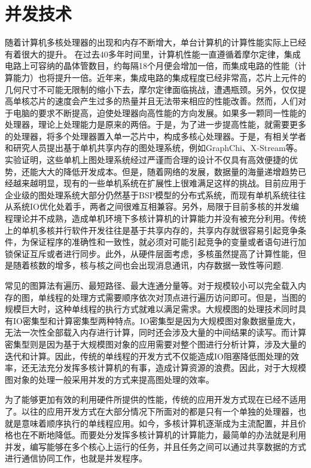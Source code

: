 \section{并发技术}

随着计算机多核处理器的出现和内存不断增大，单台计算机的计算性能实际上已经有着很大的提升。
在过去40多年时间里，计算机性能一直遵循着摩尔定律，集成电路上可容纳的晶体管数目，约每隔18个月便会增加一倍，而集成电路的性能（计算能力）也将提升一倍。近年来，集成电路的集成程度已经非常高，芯片上元件的几何尺寸不可能无限制的缩小下去，摩尔定律面临挑战，遭遇瓶颈。另外，仅仅提高单核芯片的速度会产生过多的热量并且无法带来相应的性能改善。然而，人们对于电脑的要求不断提高，迫使处理器向高性能的方向发展。如果多一颗同一性能的处理器，理论上处理能力是原来的两倍。于是，为了进一步提高性能，就需要更多的处理器，将多个处理器置入单一芯片中，构成多核心处理器。于是，有相关学者和研究人员提出基于单机共享内存的图处理系统，例如GraphChi、X-Stream等。实验证明，这些单机上图处理系统经过严谨而合理的设计不仅具有高效便捷的优势，还能大大的降低开发成本。但是，随着网络的发展，数据量的海量递增趋势已经越来越明显，现有的一些单机系统在扩展性上很难满足这样的挑战。目前应用于企业级的图处理系统大部分仍然基于BSP模型的分布式系统，而现有单机系统往往从系统IO优化处着手，两者之间很难互相兼容。另外，局限于目前多核的并发编程理论并不成熟，造成单机环境下多核计算机的计算能力并没有被充分利用。传统上的单机多核并行软件开发往往是基于共享内存的，共享内存就很容易引起竞争条件，为保证程序的准确性和一致性，就必须对可能引起竞争的变量或者语句进行加锁保证互斥或者进行同步。此外，从硬件层面考虑，多核虽然提高了计算性能，但是随着核数的增多，核与核之间也会出现消息通讯，内存数据一致性等问题.

常见的图算法有遍历、最短路径、最大连通分量等。对于规模较小可以完全载入内存的图，单线程的处理方式需要顺序依次对顶点进行遍历访问即可。但是，当图的规模巨大时，这种单线程的执行方式就难以满足需求。大规模图的处理技术同时具有IO密集型和计算密集型两种特点。IO密集型是因为大规模图对象数据量庞大，无法一次性全部载入内存进行计算，同时还会涉及大量的中间结果的读写。而计算密集型则是因为基于大规模图对象的应用需要对整个图进行分析计算，涉及大量的迭代和计算。因此，传统的单线程的开发方式不仅能造成IO阻塞降低图处理的效率，还无法充分发挥多核计算机的有事，造成计算资源的浪费。因此，对于大规模图对象的处理一般采用并发的方式来提高图处理的效率。

为了能够更加有效的利用硬件所提供的性能，传统的应用开发方式现在已经不适用了。以往的应用开发方式在大部分情况下所面对的都是只有一个单独的处理器，也就是意味着顺序执行的单线程应用。如今，多核计算机逐渐成为主流配置，并且价格也在不断地降低。而要处分发挥多核计算机的计算能力，最简单的办法就是利用并发，编写能够在多个核心上运行的任务，并且任务之间可以通过共享数据的方式进行通信协同工作，也就是并发程序。


